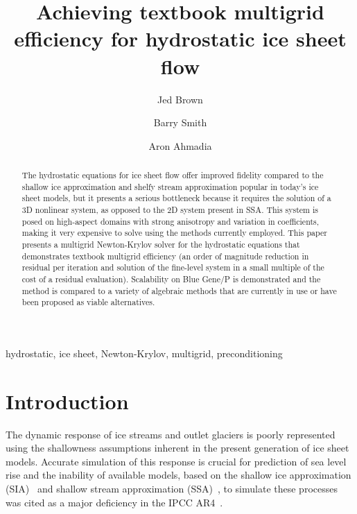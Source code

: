 \documentclass[3p]{elsarticle}
\begin{document}
\begin{frontmatter}
  \title{Achieving textbook multigrid efficiency for hydrostatic ice sheet flow}

  \author[vaw]{Jed Brown} 
  \author[mcs]{Barry Smith} 
  \author[kaust]{Aron Ahmadia} 

  \address[vaw]{Versuchsanstalt f\"ur Wasserbau, Hydrologie und Glaziologie (VAW), ETH Z\"urich, 8092     Z\"urich, Switzerland}
  \address[mcs]{Mathematics and Computer Science Division, Argonne National Laboratory, Argonne, IL     60439}
  \address[kaust]{KAUST-IBM Center for Deep Computing Research, Bldg \#1, Office 01-123,
    4700 King Abdullah University of Science and Technology,
    Thuwal Makkah 23955-6900,
    Kingdom of Saudi Arabia}

  \begin{abstract}
    The hydrostatic equations for ice sheet flow offer improved fidelity compared to the shallow ice approximation and shelfy stream approximation popular in today's ice sheet models, but it presents a serious bottleneck because it requires the solution of a 3D nonlinear system, as opposed to the 2D system present in SSA.  This system is posed on high-aspect domains with strong anisotropy and variation in coefficients, making it very expensive to solve using the methods currently employed.  This paper presents a multigrid Newton-Krylov solver for the hydrostatic equations that demonstrates textbook multigrid efficiency (an order of magnitude reduction in residual per iteration and solution of the fine-level system in a small multiple of the cost of a residual evaluation).  Scalability on Blue Gene/P is demonstrated and the method is compared to a variety of algebraic methods that are currently in use or have been proposed as viable alternatives.
  \end{abstract}
  \begin{keyword}
    hydrostatic, ice sheet, Newton-Krylov, multigrid, preconditioning
  \end{keyword}
  \thispagestyle{plain}
\end{frontmatter}

\section{Introduction}
The dynamic response of ice streams and outlet glaciers is poorly represented using the shallowness
assumptions inherent in the present generation of ice sheet models.  Accurate simulation of this
response is crucial for prediction of sea level rise and the inability of available models, based on
the shallow ice approximation (SIA)~\cite{hutter1983tgm} and shallow stream approximation
(SSA)~\cite{morland1987unconfined,weis1999theory}, to simulate these processes was cited as a major
deficiency in the IPCC AR4~\cite{ipcc2007ar4-syr}.
\end{document}
